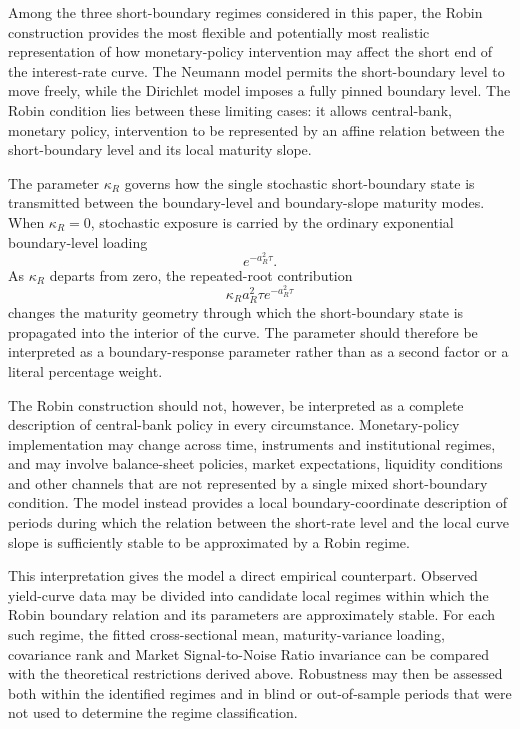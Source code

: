 \documentclass[12pt]{article}
\numberwithin{equation}{subsection}
\begin{document}
Among the three short-boundary regimes considered in this paper, the Robin construction provides the most flexible and potentially most realistic representation of how monetary-policy intervention may affect the short end of the interest-rate curve. The Neumann model permits the short-boundary level to move freely, while the Dirichlet model imposes a fully pinned boundary level. The Robin condition lies between these limiting cases: it allows central-bank, monetary policy, intervention to be represented by an affine relation between the short-boundary level and its local maturity slope.

The parameter $\kappa_R$ governs how the single stochastic short-boundary state is transmitted between the boundary-level and boundary-slope maturity modes. When $\kappa_R=0$, stochastic exposure is carried by the ordinary exponential boundary-level loading
\begin{equation}
e^{-a_R^2\tau}.
\end{equation}
As $\kappa_R$ departs from zero, the repeated-root contribution
\begin{equation}
\kappa_Ra_R^2\tau e^{-a_R^2\tau}
\end{equation}
changes the maturity geometry through which the short-boundary state is propagated into the interior of the curve. The parameter should therefore be interpreted as a boundary-response parameter rather than as a second factor or a literal percentage weight.

The Robin construction should not, however, be interpreted as a complete description of central-bank policy in every circumstance. Monetary-policy implementation may change across time, instruments and institutional regimes, and may involve balance-sheet policies, market expectations, liquidity conditions and other channels that are not represented by a single mixed short-boundary condition. The model instead provides a local boundary-coordinate description of periods during which the relation between the short-rate level and the local curve slope is sufficiently stable to be approximated by a Robin regime.

This interpretation gives the model a direct empirical counterpart. Observed yield-curve data may be divided into candidate local regimes within which the Robin boundary relation and its parameters are approximately stable. For each such regime, the fitted cross-sectional mean, maturity-variance loading, covariance rank and Market Signal-to-Noise Ratio invariance can be compared with the theoretical restrictions derived above. Robustness may then be assessed both within the identified regimes and in blind or out-of-sample periods that were not used to determine the regime classification.
\end{document}
